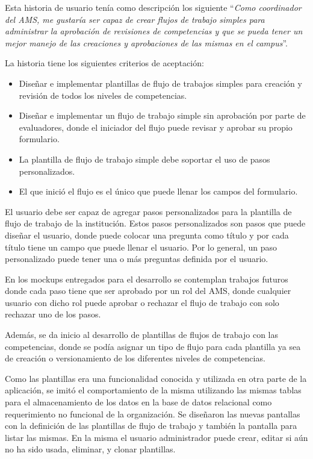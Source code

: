 Esta historia de usuario tenía como descripción los siguiente \enquote{\textit{Como coordinador del AMS, me gustaría ser capaz de crear flujos de trabajo simples para administrar la aprobación de revisiones de competencias y que se pueda tener un mejor manejo de las creaciones y aprobaciones de las mismas en el campus}}.

La historia tiene los siguientes criterios de aceptación:
\begin{itemize}
	\item Diseñar e implementar plantillas de flujo de trabajos simples para creación y revisión de todos los niveles de competencias.
	\item Diseñar e implementar un flujo de trabajo simple sin aprobación por parte de evaluadores, donde el iniciador del flujo puede revisar y aprobar su propio formulario.
	\item La plantilla de flujo de trabajo simple debe soportar el uso de pasos personalizados.
	\item El que inició el flujo es el único que puede llenar los campos del formulario.
\end{itemize}

El usuario debe ser capaz de agregar pasos personalizados para la plantilla de flujo de trabajo de la institución. Estos pasos personalizados son pasos que puede diseñar el usuario, donde puede colocar una pregunta como título y por cada título tiene un campo que puede llenar el usuario. Por lo general, un paso personalizado puede tener una o más preguntas definida por el usuario.

En los mockups entregados para el desarrollo se contemplan trabajos futuros donde cada paso tiene que ser aprobado por un rol del AMS, donde cualquier usuario con dicho rol puede aprobar o rechazar el flujo de trabajo con solo rechazar uno de los pasos. 

Además, se da inicio al desarrollo de plantillas de flujos de trabajo con las competencias, donde se podía asignar un tipo de flujo para cada plantilla ya sea de creación o versionamiento de los diferentes niveles de competencias.

Como las plantillas era una funcionalidad conocida y utilizada en otra parte de la aplicación, se imitó el comportamiento de la misma utilizando las mismas tablas para el almacenamiento de los datos en la base de datos relacional como requerimiento no funcional de la organización. Se diseñaron las nuevas pantallas con la definición de las plantillas de flujo de trabajo y también la pantalla para listar las mismas. En la misma el usuario administrador puede crear, editar si aún no ha sido usada, eliminar, y clonar plantillas.

